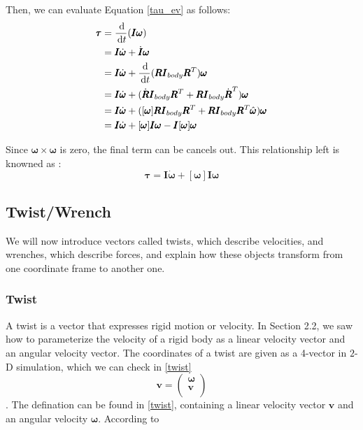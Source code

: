 Then, we can evaluate Equation \ref{tau_ev} as follows:
\begin{equation}
    \begin{aligned}
        \pmb{\tau} &= \frac{\,\mathrm{d}}{\,\mathrm{d} t}(\pmb{I}\pmb{\omega}) \\
        &= \pmb{I}\dot{\pmb{\omega}} + \dot{\pmb{I}}\pmb{\omega} \\
        &= \pmb{I}\dot{\pmb{\omega}} + \frac{\,\mathrm{d}}{\,\mathrm{d} t}(\pmb{R}\pmb{I}_{body}\pmb{R}^{T})\pmb{\omega} \\
        &= \pmb{I}\dot{\pmb{\omega}} + (\dot{\pmb{R}}\pmb{I}_{body}\pmb{R}^{T} + \pmb{R}\pmb{I}_{body}\dot{\pmb{R}}^{T})\pmb{\omega} \\
        &= \pmb{I}\dot{\pmb{\omega}} + ([\pmb{\omega}]\pmb{R}\pmb{I}_{body}\pmb{R}^{T} + \pmb{R}\pmb{I}_{body}\pmb{R}^{T} \hat{\pmb{\omega}})\pmb{\omega} \\
        &= \pmb{I}\dot{\pmb{\omega}} + [\pmb{\omega}]\pmb{I}\pmb{\omega} - \pmb{I}[\pmb{\omega}]\pmb{\omega}
    \end{aligned}
    \label{tau_ev}
\end{equation}

Since $\pmb{\omega} \times \pmb{\omega}$ is zero, the final term can be cancels out. This relationship left is knowned as :
\begin{equation}
    \pmb{\tau} = \pmb{I}\dot{\pmb{\omega}} + [\pmb{\omega}]\pmb{I}\pmb{\omega}
\end{equation}


\subsection{Twist/Wrench}
We will now introduce vectors called twists, which describe velocities, and wrenches, which describe forces, and explain how these objects transform from one coordinate frame to another one. 
    \subsubsection{Twist} 
        A twist is a vector that expresses rigid motion or velocity. In Section 2.2, we saw how to parameterize the velocity of a rigid body as a linear velocity vector and an angular velocity vector. The coordinates of a twist are given as a 4-vector in $2$-D simulation, which we can check in \ref{twist}
            \begin{equation}
                \mathbf{v} = \left( \begin{array}{c} \pmb{\omega} \\ \pmb{v} \\ \end{array} \right )
                \label{twist}
            \end{equation}.
        The defination can be found in \ref{twist}, containing a linear velocity vector \(\pmb{v}\) and an angular velocity \(\pmb{\omega}\). According to 

